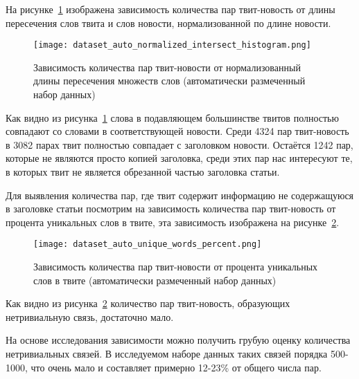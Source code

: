         На рисунке~\ref{pic:auto_histogram} изображена зависимость количества пар твит-новость от длины пересечения слов твита и слов новости, нормализованной по длине новости.
        \begin{figure}[h!]
            \center
            \texttt{[image: dataset\_auto\_normalized\_intersect\_histogram.png]}
            \caption{Зависимость количества пар твит-новости от нормализованный длины пересечения множеств слов (автоматически размеченный набор данных)}
            \label{pic:auto_histogram}
        \end{figure}
        Как видно из рисунка~\ref{pic:auto_histogram} слова в подавляющем большинстве твитов полностью совпадают со словами в соответствующей новости.
        Среди 4324 пар твит-новость в 3082 парах твит полностью совпадает с заголовком новости. Остаётся 1242 пар, которые не являются просто копией заголовка, среди этих пар
        нас интересуют те, в которых твит не является обрезанной частью заголовка статьи.

        Для выявления количества пар, где твит содержит информацию не содержащуюся в заголовке статьи посмотрим на зависимость количества пар твит-новость от процента уникальных слов в твите,
        эта зависимость изображена на рисунке~\ref{pic:auto_percent}.
        \begin{figure}[h!]
            \center
            \texttt{[image: dataset\_auto\_unique\_words\_percent.png]}
            \caption{Зависимость количества пар твит-новости от процента уникальных слов в твите (автоматически размеченный набор данных)}
            \label{pic:auto_percent}
        \end{figure}
        Как видно из рисунка~\ref{pic:auto_percent} количество пар твит-новость, образующих нетривиальную связь, достаточно мало.

        На основе исследования зависимости можно получить грубую оценку количества нетривиальных связей.
        В исследуемом наборе данных таких связей порядка 500-1000, что очень мало и составляет примерно 12-23\% от общего числа пар.

